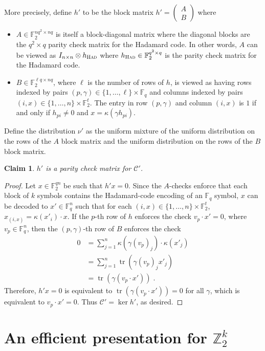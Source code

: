\documentclass[11pt]{article}
\newtheorem{claim}[theorem]{Claim}
\theoremstyle{definition}
\newcommand{\code}{\mathscr{C}}
\newcommand{\F}{\ensuremath{\mathbb{F}}}
\newcommand{\Z}{\ensuremath{\mathbb{Z}}}
\newcommand{\had}{\textsc{Had}}
\DeclareMathOperator{\tr}{tr}
\begin{document}
More precisely, define $h'$ to be the block matrix $h'=\begin{pmatrix} A \\ B \end{pmatrix}$ where 
\begin{itemize}
	\item $A \in \F_2^{nq^2 \times nq}$ is itself a block-diagonal matrix where the diagonal blocks are the $q^2 \times q$ parity check matrix for the Hadamard code. 
	In other words, $A$ can be viewed as $I_{n\times n} \otimes h_\had$ where $h_\had \in \F_2^{q^2 \times q}$ is the parity check matrix for the Hadamard code. 
	\item $B \in \F_2^{\ell q \times nq}$, where $\ell$ is the number of rows of $h$, is viewed as having rows indexed by pairs $(p,\gamma) \in \{1,\ldots,\ell\} \times \F_q$ and columns indexed by pairs $(i,x) \in \{1,\ldots,n\} \times \F_2^t$. The entry in row $(p,\gamma)$ and column $(i,x)$ is $1$ if and only if $h_{pi} \neq 0$ and $x = \kappa(\gamma h_{pi})$.
\end{itemize}
Define the distribution $\nu'$ as the uniform mixture of the uniform distribution on the rows of the $A$ block matrix and the uniform distribution on the rows of the $B$ block matrix. 

\begin{claim}
$h'$ is a parity check matrix for $\code'$.
\end{claim}


\begin{proof}
Let $x\in \F_2^{qn}$ be such that $h'x=0$. Since the $A$-checks enforce that each block of $k$ symbols contains the Hadamard-code encoding of an $\F_q$ symbol, $x$ can be decoded to $x'\in \F_q^n$ such that for each $(i,x)\in \{1,\ldots,n\}\times \F_2^t$, $x_{(i,x)} = \kappa(x'_i)\cdot x$. If the $p$-th row of $h$ enforces the check $v_p\cdot x'=0$, where $v_p\in \F_q^n$, then 
the $(p,\gamma)$-th row of $B$ enforces the check 
\begin{align*}
0&=\sum_{j=1}^n \kappa(\gamma (v_p)_j) \cdot \kappa(x'_j)\\
&= \sum_{j=1}^n \tr( \gamma (v_p)_j x'_j) \\
&= \tr(\gamma (v_p\cdot  x'))\;.
\end{align*}
Therefore, $h'x=0$ is equivalent to $\tr(\gamma(v_p \cdot x'))=0$ for all $\gamma$, which is equivalent to $v_p\cdot x'=0$. Thus $\code'=\ker h'$, as desired. 
\end{proof}

\section{An efficient presentation for $\Z_2^k$}
\label{sec:eff-z2k}
\end{document}
